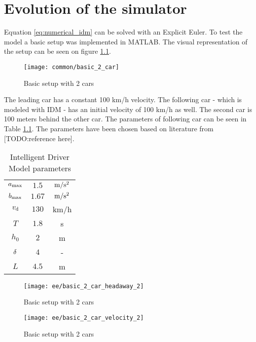 \chapter{Evolution of the simulator}
	Equation \ref{eq:numerical_idm} can be solved with an Explicit Euler. To test the model a basic setup was implemented in MATLAB. The visual representation of the setup can be seen on figure \ref{fig:basic2car}.
	\begin{figure}[ht]
		\centering
		\texttt{[image: common/basic\_2\_car]}
		\caption{Basic setup with 2 cars}
		\label{fig:basic2car}
	\end{figure}
	The leading car has a constant 100 km/h velocity. The following car - which is modeled with IDM - has an initial velocity of 100 km/h as well. The second car is 100 meters behind the other car. The parameters of following car can be seen in Table \ref{tab:idm_params}. The parameters have been chosen based on literature from [TODO:reference here].
	\begin{table}[ht]
		\begin{center}
			\begin{tabular}{ |c|c|c| }
				\hline
				$a_{\rm max}$ & $1.5$ & $\rm m/s^2$ \\
				$b_{\rm max}$ & $1.67$ & $\rm m/s^2$ \\
				$v_{\rm d}$ & $130$ & km/h \\
				$T$ & $1.8$ & s \\
				$h_0$ & $2$ & m \\
				$\rm \delta$ & $4$ & - \\
				$L$ & $4.5$ & m \\
				\hline
			\end{tabular}
		\end{center}
		\caption{Intelligent Driver Model parameters}
		\label{tab:idm_params}
	\end{table}
	\begin{figure}
		\centering
		\begin{minipage}{.5\textwidth}
			\centering
			\texttt{[image: ee/basic\_2\_car\_headaway\_2]}
			\caption{Basic setup with 2 cars}
			\label{fig:basic2car_result_1}
		\end{minipage}\hfill
		\begin{minipage}{.5\textwidth}
			\centering
			\texttt{[image: ee/basic\_2\_car\_velocity\_2]}
			\caption{Basic setup with 2 cars}
			\label{fig:basic2car_result_2}
		\end{minipage}
	\end{figure}